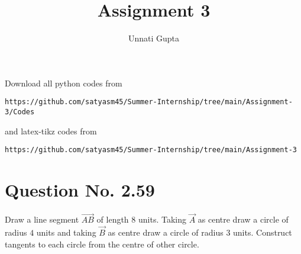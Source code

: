 \documentclass[journal,12pt,twocolumn]{IEEEtran}
\begin{document}
     \def\centbox#1{\makebox[0in]{#1}}
     \def\topbox#1{\raisebox{-\baselineskip}[0in][0in]{#1}}
     \def\midbox#1{\raisebox{-0.5\baselineskip}[0in][0in]{#1}}
\vspace{3cm}
\title{Assignment 3}
\author{Unnati Gupta}
\maketitle
\newpage
\bigskip
\renewcommand{\thefigure}{\theenumi}
\renewcommand{\thetable}{\theenumi}
Download all python codes from 
\begin{lstlisting}
https://github.com/satyasm45/Summer-Internship/tree/main/Assignment-3/Codes
\end{lstlisting}
%
and latex-tikz codes from 
%
\begin{lstlisting}
https://github.com/satyasm45/Summer-Internship/tree/main/Assignment-3
\end{lstlisting}
%
\section{Question No. 2.59}
Draw a line segment $\vec{AB}$ of length 8 units. Taking $\vec{A}$ as centre draw a circle of radius $4$ units and taking $\vec{B}$ as centre draw a circle of radius $3$ units. Construct tangents to each circle from the centre of other circle.

%
\end{document}
